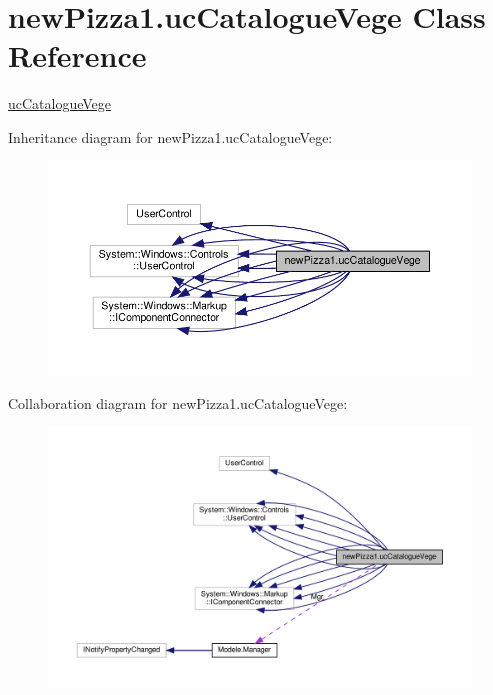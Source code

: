 \hypertarget{classnewPizza1_1_1ucCatalogueVege}{}\section{new\+Pizza1.\+uc\+Catalogue\+Vege Class Reference}
\label{classnewPizza1_1_1ucCatalogueVege}


\hyperlink{classnewPizza1_1_1ucCatalogueVege}{uc\+Catalogue\+Vege}  




Inheritance diagram for new\+Pizza1.\+uc\+Catalogue\+Vege\+:
\nopagebreak
\begin{figure}[H]
\begin{center}
\leavevmode
\includegraphics[width=350pt]{classnewPizza1_1_1ucCatalogueVege__inherit__graph}
\end{center}
\end{figure}


Collaboration diagram for new\+Pizza1.\+uc\+Catalogue\+Vege\+:
\nopagebreak
\begin{figure}[H]
\begin{center}
\leavevmode
\includegraphics[width=350pt]{classnewPizza1_1_1ucCatalogueVege__coll__graph}
\end{center}
\end{figure}
